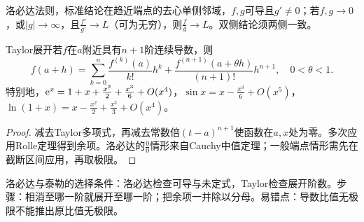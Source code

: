 \begin{theorem}{洛必达法则，标准结论}在趋近端点的去心单侧邻域，$f,g$可导且$g\prime\ne0$；若$f,g\to0$，或$|g|\to\infty$，且$\frac{f\prime}{g\prime}\to L$（可为无穷），则$\frac{f}{g}\to L$。双侧结论须两侧一致。\end{theorem}
\begin{theorem}{Taylor展开}若$f$在$a$附近具有$n+1$阶连续导数，则
\begin{equation}f(a+h)=\sum_{k=0}^{n}\dfrac{f^{(k)}(a)}{k!}h^k+\dfrac{f^{(n+1)}(a+\theta h)}{(n+1)!}h^{n+1},\quad0<\theta<1.\end{equation}
特别地，$\mathrm{e}^x=1+x+\frac{x^2}{2}+\frac{x^3}{6}+O(x^4)$，$\sin x=x-\frac{x^3}{6}+O(x^5)$，$\ln(1+x)=x-\frac{x^2}{2}+\frac{x^3}{3}+O(x^4)$。\end{theorem}
\begin{proof}减去Taylor多项式，再减去常数倍$(t-a)^{n+1}$使函数在$a,x$处为零。多次应用Rolle定理得到余项。洛必达的$\frac{0}{0}$情形来自Cauchy中值定理；一般端点情形需先在截断区间应用，再取极限。\end{proof}

\begin{method}{洛必达与泰勒的选择}条件：洛必达检查可导与未定式，Taylor检查展开阶数。步骤：相消至哪一阶就展开至哪一阶；把余项一并除以分母。易错点：导数比值无极限不能推出原比值无极限。\end{method}
